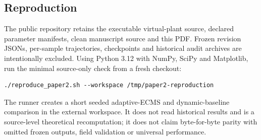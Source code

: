 \documentclass[11pt,a4paper]{article}
\begin{document}
\subsection*{Reproduction}
The public repository retains the executable virtual-plant source, declared parameter manifests, clean manuscript source and this PDF. Frozen revision JSONs, per-sample trajectories, checkpoints and historical audit archives are intentionally excluded. Using Python 3.12 with NumPy, SciPy and Matplotlib, run the minimal source-only check from a fresh checkout:
\begin{verbatim}
./reproduce_paper2.sh --workspace /tmp/paper2-reproduction
\end{verbatim}
The runner creates a short seeded adaptive-ECMS and dynamic-baseline comparison in the external workspace. It does not read historical results and is a source-level theoretical recomputation; it does not claim byte-for-byte parity with omitted frozen outputs, field validation or universal performance.
\end{document}
